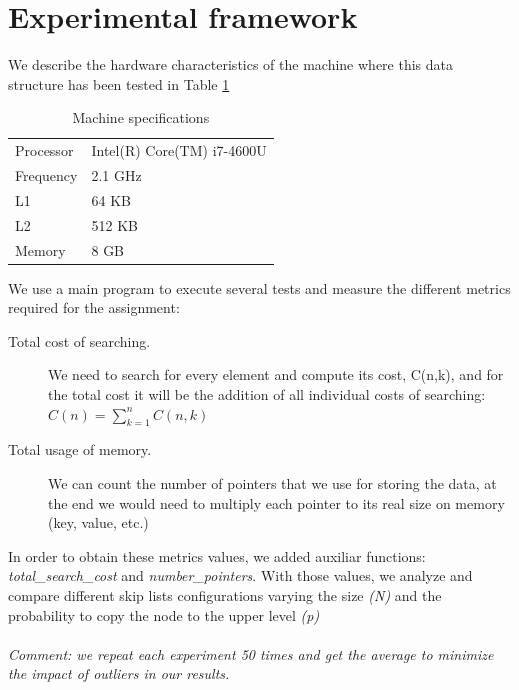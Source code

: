 \documentclass{article}
\begin{document}
\section{Experimental framework}

We describe the hardware characteristics of the machine where this data structure has been tested in Table \ref{table:specs}


\begin{table}[H]
    \centering
    \begin{tabular}{@{}ll@{}}
    \toprule
    Processor & Intel(R) Core(TM) i7-4600U \\
    Frequency & 2.1 GHz                    \\
    L1        & 64 KB                      \\
    L2        & 512 KB                     \\
    Memory    & 8 GB                       \\ \bottomrule
    \end{tabular}%
    \caption{Machine specifications}
    \label{table:specs}
\end{table}

We use a main program to execute several tests and measure the different metrics required for the assignment:
\begin{description}
    \item[Total cost of searching.]{We need to search for every element and compute its cost, C(n,k), and for the total cost it will be the addition of all individual costs of searching: $C(n) = \sum_{k=1}^{n}C(n,k)$}
    \item[Total usage of memory.]{We can count the number of pointers that we use for storing the data, at the end we would need to multiply each pointer to its real size on memory (key, value, etc.)}
\end{description}

In order to obtain these metrics values, we added auxiliar functions: \textit{total\_search\_cost} and \textit{number\_pointers}. With those values, we analyze and compare different skip lists configurations varying the size \textit{(N)} and the probability to copy the node to the upper level \textit{(p)}\\
\\
\textit{Comment: we repeat each experiment 50 times and get the average to minimize the impact of outliers in our results.}\\
\end{document}

